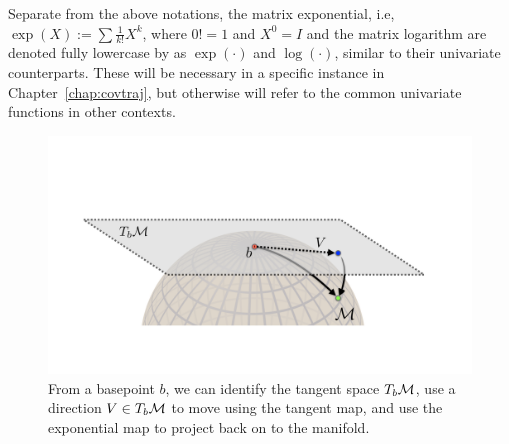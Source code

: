 Separate from the above notations, the matrix exponential, i.e, $\exp(X):= \sum \frac{1}{k!} X^k$, where $0!=1$ and $X^0=I$  and the matrix logarithm are denoted fully lowercase by as $\exp(\cdot)$ and $\log(\cdot)$, similar to their univariate counterparts. These will be necessary in a specific instance in Chapter~\ref{chap:covtraj}, but otherwise will refer
to the common univariate functions in other contexts.
\begin{figure}
	\centering
	\includegraphics[width=\textwidth,trim={0 7cm 5cm 10cm},clip]{2_bknd/manifoldops.pdf}
	\caption[Operations on the Manifold]{From a basepoint $b$, we can identify the tangent space $T_b\mathcal{M}$, use a direction $V\in T_b\mathcal{M}$ to move using the tangent map, and use the exponential map to project back on to the manifold.}
	\label{fig:ot}
\end{figure}

